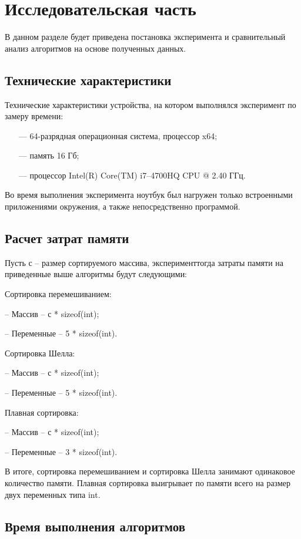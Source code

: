 \chapter{Исследовательская часть}

В данном разделе будет приведена постановка эксперимента и сравнительный анализ алгоритмов на основе полученных данных.

\section{Технические характеристики}

Технические характеристики устройства, на котором выполнялся эксперимент по замеру времени:

\begin{itemize}
	\item[---] 64-разрядная операционная система, процессор x64;
	\item[---] память 16 Гб;
	\item[---] процессор Intel(R) Core(TM) i7--4700HQ CPU @ 2.40 ГГц.
\end{itemize}

Во время выполнения эксперимента ноутбук был нагружен только встроенными приложениями окружения, а также непосредственно программой.
\section{Расчет затрат памяти}
Пусть с -- размер сортируемого массива, эксперименттогда затраты памяти
на приведенные выше алгоритмы будут следующими:


Сортировка перемешиванием:


-- Массив -- с * sizeof(int);


-- Переменные -- 5 * sizeof(int).


Сортировка Шелла:


--  Массив -- с * sizeof(int);


-- Переменные -- 5 * sizeof(int).


Плавная сортировка:


-- Массив -- с * sizeof(int);


-- Переменные -- 3 * sizeof(int).


В итоге, сортировка перемешиванием и сортировка Шелла занимают одинаковое количество памяти. Плавная сортировка выигрывает по памяти всего на размер двух переменных типа int.
\section{Время выполнения алгоритмов}

